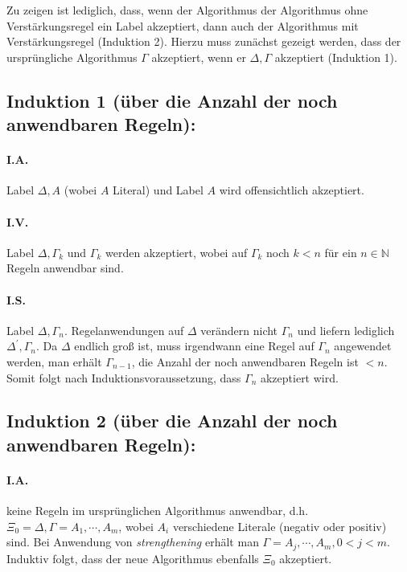 Zu zeigen ist lediglich, dass, wenn der Algorithmus der Algorithmus ohne Verstärkungsregel ein Label akzeptiert, dann
auch der Algorithmus mit Verstärkungsregel (Induktion 2). Hierzu muss zunächst gezeigt werden, dass der ursprüngliche Algorithmus
$\Gamma$ akzeptiert, wenn er $\Delta, \Gamma$ akzeptiert (Induktion 1).

\subsection*{Induktion 1 (über die Anzahl der noch anwendbaren Regeln):}
\paragraph{I.A.} Label $\Delta, A$ (wobei $A$ Literal) und Label $A$ wird offensichtlich akzeptiert.
\paragraph{I.V.} Label $\Delta, \Gamma_k$ und $\Gamma_k$ werden akzeptiert, wobei auf $\Gamma_k$ noch $k < n$ für ein $n
\in \mathbb{N}$ Regeln anwendbar sind.
\paragraph{I.S.} Label $\Delta, \Gamma_n$. Regelanwendungen auf $\Delta$ verändern nicht $\Gamma_n$ und liefern
lediglich $\Delta^\prime, \Gamma_n$. Da $\Delta$ endlich groß ist, muss irgendwann eine Regel auf $\Gamma_n$ angewendet
werden, man erhält $\Gamma_{n-1}$, die Anzahl der noch anwendbaren Regeln ist $< n$. Somit folgt nach
Induktionsvoraussetzung, dass $\Gamma_n$ akzeptiert wird.
\vspace{0.6cm}

\subsection*{Induktion 2 (über die Anzahl der noch anwendbaren Regeln):}
\paragraph{I.A.} keine Regeln im ursprünglichen Algorithmus anwendbar, d.h. $\Xi_0 = \Delta, \Gamma = A_1, \cdots,
A_m$, wobei $A_i$ verschiedene Literale (negativ oder positiv) sind. Bei Anwendung von \emph{strengthening} erhält man
$\Gamma = A_j, \cdots, A_m, 0 < j < m$. Induktiv folgt, dass der neue Algorithmus ebenfalls $\Xi_0$ akzeptiert.

